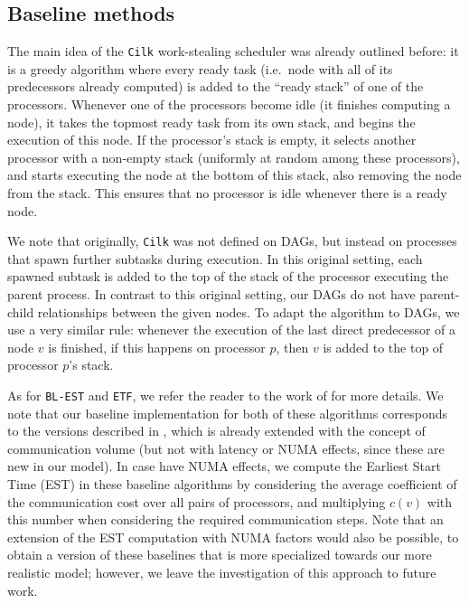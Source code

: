 \documentclass[sigconf,nonacm]{acmart}
\begin{document}
\subsection{Baseline methods}

The main idea of the \texttt{Cilk} work-stealing scheduler was already outlined before: it is a greedy algorithm where every ready task (i.e.\ node with all of its predecessors already computed) is added to the ``ready stack'' of one of the processors. Whenever one of the processors become idle (it finishes computing a node), it takes the topmost ready task from its own stack, and begins the execution of this node. If the processor's stack is empty, it selects another processor with a non-empty stack (uniformly at random among these processors), and starts executing the node at the bottom of this stack, also removing the node from the stack. This ensures that no processor is idle whenever there is a ready node.

We note that originally, \texttt{Cilk} was not defined on DAGs, but instead on processes that spawn further subtasks during execution. In this original setting, each spawned subtask is added to the top of the stack of the processor executing the parent process. In contrast to this original setting, our DAGs do not have parent-child relationships between the given nodes. To adapt the algorithm to DAGs, we use a very similar rule: whenever the execution of the last direct predecessor of a node $v$ is finished, if this happens on processor $p$, then $v$ is added to the top of processor $p$'s stack.

As for \texttt{BL-EST} and \texttt{ETF}, we refer the reader to the work of \cite{SPD} for more details. We note that our baseline implementation for both of these algorithms corresponds to the versions described in \cite{SPD}, which is already extended with the concept of communication volume (but not with latency or NUMA effects, since these are new in our model). In case have NUMA effects, we compute the Earliest Start Time (EST) in these baseline algorithms by considering the average coefficient of the communication cost over all pairs of processors, and multiplying $c(v)$ with this number when considering the required communication steps. Note that an extension of the EST computation with NUMA factors would also be possible, to obtain a version of these baselines that is more specialized towards our more realistic model; however, we leave the investigation of this approach to future work.
\end{document}

